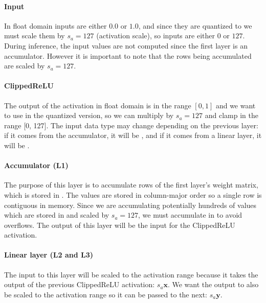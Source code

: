 \paragraph[short]{Input} In float domain inputs are either $0.0$ or $1.0$, and since they are quantized to  we must scale them by $s_a=127$ (activation scale), so inputs are either $0$ or $127$. During inference, the input values are not computed since the first layer is an accumulator. However it is important to note that the rows being accumulated are scaled by $s_a=127$.

\paragraph[short]{ClippedReLU} The output of the activation in float domain is in the range $[0, 1]$ and we want to use  in the quantized version, so we can multiply by $s_a=127$ and clamp in the range [0, 127]. The input data type may change depending on the previous layer: if it comes from the accumulator, it will be , and if it comes from a linear layer, it will be .


\paragraph[short]{Accumulator (L1)}



The purpose of this layer is to accumulate rows of the first layer's weight matrix, which is stored in . The values are stored in column-major order so a single row is contiguous in memory. Since we are accumulating potentially hundreds of values which are stored in  and scaled by $s_a=127$, we must accumulate in  to avoid overflows. The output of this layer will be the input for the ClippedReLU activation.

\paragraph[short]{Linear layer (L2 and L3)} The input to this layer will be scaled to the activation range because it takes the output of the previous ClippedReLU activation: $s_a \bm{x}$. We want the output to also be scaled to the activation range so it can be passed to the next: $s_a \bm{y}$.

